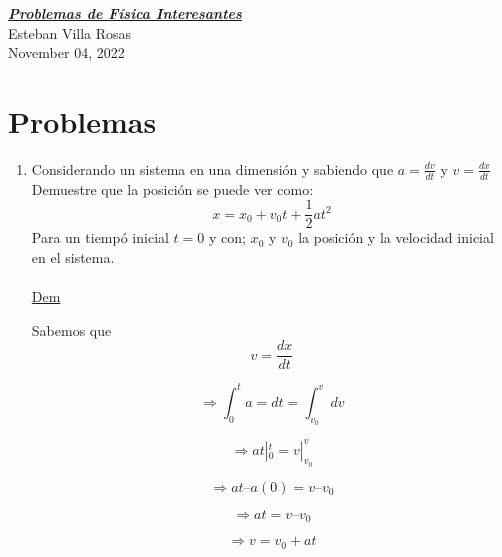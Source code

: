 \documentclass[letterpaper, 12pt]{article}
\begin{document}
\begin{center}

{\Huge{{\textbf{\emph{\underline{Problemas de Física Interesantes}}}}}}\\

{\small{Esteban Villa Rosas }}\\

{\small{November 04, 2022}}

\end{center}



\section{Problemas}

\begin{enumerate}

\item {{Considerando un sistema en una dimensión y sabiendo que $a=\frac{dv}{dt}$ y $v=\frac{dx}{dt}$ Demuestre que la posición se puede ver como:}}
    \begin{equation}
    \label{Ecuación de posición en el eje x}
        x=x_0 + v_0 t + \frac{1}{2} at^2
    \end{equation}
Para un tiempó inicial $t= 0 $ y con; $x_0$ y $v_0 $ la posición y la velocidad inicial en el sistema.\\\\
\underline{Dem}

Sabemos que 
\begin{equation}
    v=\frac{dx}{dt}
\end{equation}

\begin {equation}
\Longrightarrow\int_{0} ^{t} a = dt = \int_{v_0}^{v} dv
\end{equation}

\begin {equation}
\Longrightarrow at |_{0}^{t} = v |_{v_0}^{v} 
\end{equation}

\begin {equation}
\Longrightarrow at – a(0) = v – v_0
\end{equation}

\begin{equation}
\Longrightarrow at = v – v_0
\end{equation}

\begin{equation}
\label{Eq de velocidad}
\Longrightarrow v = v_0 + at 
\end{equation}


\end{enumerate}
\end{document}
